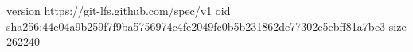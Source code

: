 version https://git-lfs.github.com/spec/v1
oid sha256:44e04a9b259f7f9ba5756974c4fe2049fc0b5b231862de77302c5ebff81a7be3
size 262240
